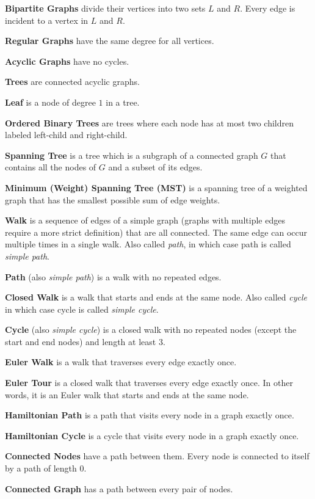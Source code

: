 \documentclass[../main.tex]{subfiles}
\begin{document}
\textbf{Bipartite Graphs} divide their vertices into two sets $L$ and $R$. Every edge is incident to a vertex in $L$ and $R$.

\textbf{Regular Graphs} have the same degree for all vertices.

\textbf{Acyclic Graphs} have no cycles.

\textbf{Trees} are connected acyclic graphs.

\textbf{Leaf} is a node of degree $1$ in a tree.

\textbf{Ordered Binary Trees} are trees where each node has at most two children labeled left-child and right-child.

\textbf{Spanning Tree} is a tree which is a subgraph of a connected graph $G$ that contains all the nodes of $G$ and a subset of its edges.

\textbf{Minimum (Weight) Spanning Tree (MST)} is a spanning tree of a weighted graph that has the smallest possible sum of edge weights.

\textbf{Walk} is a sequence of edges of a simple graph (graphs with multiple edges require a more strict definition) that are all connected. The same edge can occur multiple times in a single walk. Also called \textit{path}, in which case path is called \textit{simple path}.

\textbf{Path} (also \textit{simple path}) is a walk with no repeated edges.

\textbf{Closed Walk} is a walk that starts and ends at the same node. Also called \textit{cycle} in which case cycle is called \textit{simple cycle}.

\textbf{Cycle} (also \textit{simple cycle}) is a closed walk with no repeated nodes (except the start and end nodes) and length at least $3$.

\textbf{Euler Walk} is a walk that traverses every edge exactly once.

\textbf{Euler Tour} is a closed walk that traverses every edge exactly once. In other words, it is an Euler walk that starts and ends at the same node.

\textbf{Hamiltonian Path} is a path that visits every node in a graph exactly once.

\textbf{Hamiltonian Cycle} is a cycle that visits every node in a graph exactly once.

\textbf{Connected Nodes} have a path between them. Every node is connected to itself by a path of length $0$.

\textbf{Connected Graph} has a path between every pair of nodes.
\end{document}
